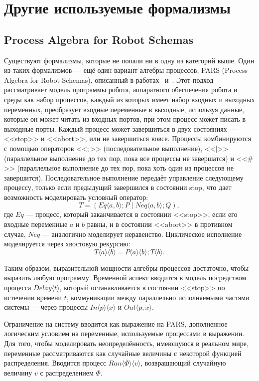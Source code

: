 \documentclass[conference]{IEEEtran}
\begin{document}
\section{Другие используемые формализмы}

\subsection{Process Algebra for Robot Schemas}

Существуют формализмы, которые не попали ни в одну из категорий выше. 
Один из таких формализмов --- ещё один вариант алгебры процессов, 
PARS (Process Algebra for Robot Schemas), описанный в работах~\cite{lyons2015performance} 
и~\cite{lyons2013software}. Этот подход рассматривает модель программы робота, 
аппаратного обеспечения робота и среды как набор процессов, каждый из которых 
имеет набор входных и выходных переменных, преобразует входные переменные в 
выходные, используя данные, которые он может читать из входных портов, при этом 
процесс может писать в выходные порты. Каждый процесс может завершиться 
в двух состояниях --- <<stop>> и <<abort>>, или не завершиться вовсе. Процессы 
комбинируются с помощью операторов <<$;$>> (последовательное выполнение), <<$|$>> 
(параллельное выполнение до тех пор, пока все процессы не завершатся) и <<$\#$>> 
(параллельное выполнение до тех пор, пока хоть один из процессов не завершится). 
Последовательное выполнение передаёт управление следующему процессу, только если 
предыдущий завершился в состоянии stop, что дает возможность моделировать 
условный оператор:
$$T = (Eq\langle a,b\rangle; P\;|\;Neq\langle a,b\rangle;Q),$$
где $Eq$ --- процесс, который заканчивается в состоянии <<stop>>, если 
его входные переменные $a$ и $b$ равны, и в состоянии <<abort>> в противном 
случае, $Neq$ --- аналогично моделирует неравенство. Циклическое 
исполнение моделируется через хвостовую рекурсию: 
$$T\langle a\rangle\langle b\rangle = P\langle a\rangle\langle b\rangle; T\langle b\rangle.$$

Таким образом, выразительной мощности алгебры процессов достаточно, чтобы 
выразить любую программу. Временной аспект вводится в модель посредством 
процесса $Delay\langle t\rangle$, который останавливается в состоянии <<stop>> по 
истечении времени $t$, коммуникации между параллельно исполняемыми частями 
системы --- через процессы $In\langle p\rangle\langle x\rangle$ и $Out\langle p, x\rangle$.

Ограничение на систему вводится как выражение на PARS, дополненное логическим 
условием на переменные, используемые процессами в выражении. Для того, чтобы 
моделировать неопределённость, имеющуюся в реальном мире, переменные 
рассматриваются как случайные величины с некоторой функцией распределения.
Вводится процесс $Ran\langle\Phi\rangle\langle v\rangle$, возвращающий случайную величину 
$v$ с распределением $\Phi$.
\end{document}

